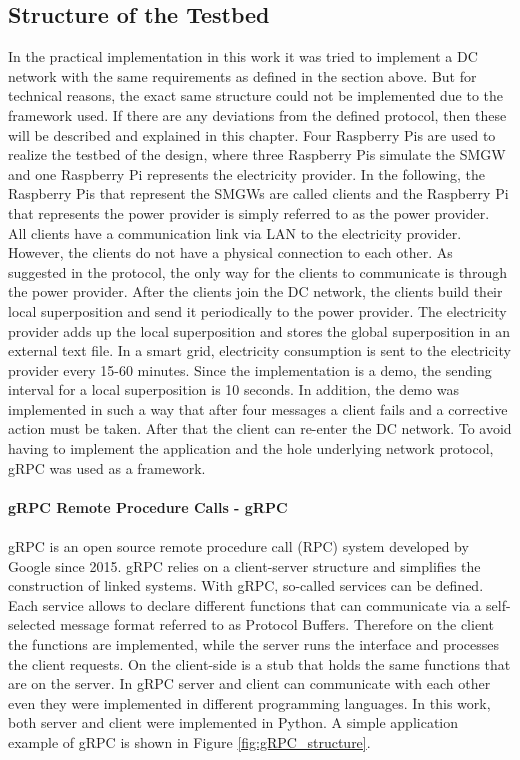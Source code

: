 \subsection{Structure of the Testbed}
In the practical implementation in this work it was tried to implement a DC network with the same requirements as defined in the section above. But for technical reasons, the exact same structure could not be implemented due to the framework used. If there are any deviations from the defined protocol, then these will be described and explained in this chapter.
Four Raspberry Pis are used to realize the testbed of the design, where three Raspberry Pis simulate the SMGW and one Raspberry Pi represents the electricity provider. In the following, the Raspberry Pis that represent the SMGWs are called clients and the Raspberry Pi that represents the power provider is simply referred to as the power provider. All clients have a communication link via LAN to the electricity provider. However, the clients do not have a physical connection to each other. As suggested in the protocol, the only way for the clients to communicate is through the power provider. After the clients join the DC network, the clients build their local superposition and send it periodically to the power provider. The electricity provider adds up the local superposition and stores the global superposition in an external text file. In a smart grid, electricity consumption is sent to the electricity provider every 15-60 minutes. Since the implementation is a demo, the sending interval for a local superposition is 10 seconds. In addition, the demo was implemented in such a way that after four messages a client fails and a corrective action must be taken. After that the client can re-enter the DC network. To avoid having to implement the application and the hole underlying network protocol, gRPC was used as a framework.\\
\\
\textbf{gRPC Remote Procedure Calls - gRPC}
\\
\\
gRPC \cite{gRPC} is an open source remote procedure call (RPC) system developed by Google since 2015. gRPC relies on a client-server structure and simplifies the construction of linked systems. With gRPC, so-called services can be defined. Each service allows to declare different functions that can communicate via a self-selected message format referred to as Protocol Buffers. Therefore on the client the functions are implemented, while the server runs the interface and processes the client requests. On the client-side is a stub that holds the same functions that are on the server. In gRPC server and client can communicate with each other even they were implemented in different programming languages. In this work, both server and client were implemented in Python. A simple application example of gRPC is shown in Figure \ref{fig:gRPC_structure}.
